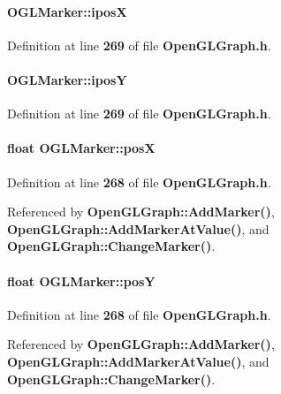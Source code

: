\paragraph[{iposX}]{ O\+G\+L\+Marker\+::iposX}\label{structOGLMarker_a1dced33c4fd1c502b32de2a3e44dea6b}


Definition at line {\bf 269} of file {\bf Open\+G\+L\+Graph.\+h}.

\paragraph[{iposY}]{ O\+G\+L\+Marker\+::iposY}\label{structOGLMarker_abf98cad4f7bb963352de5646a562b5a8}


Definition at line {\bf 269} of file {\bf Open\+G\+L\+Graph.\+h}.

\paragraph[{posX}]{\setlength{\rightskip}{0pt plus 5cm}float O\+G\+L\+Marker\+::posX}\label{structOGLMarker_a04a6f72531de5ad7d2de7ad1634b6126}


Definition at line {\bf 268} of file {\bf Open\+G\+L\+Graph.\+h}.



Referenced by {\bf Open\+G\+L\+Graph\+::\+Add\+Marker()}, {\bf Open\+G\+L\+Graph\+::\+Add\+Marker\+At\+Value()}, and {\bf Open\+G\+L\+Graph\+::\+Change\+Marker()}.

\paragraph[{posY}]{\setlength{\rightskip}{0pt plus 5cm}float O\+G\+L\+Marker\+::posY}\label{structOGLMarker_af76f9d68749df1f38a03b14686a45a12}


Definition at line {\bf 268} of file {\bf Open\+G\+L\+Graph.\+h}.



Referenced by {\bf Open\+G\+L\+Graph\+::\+Add\+Marker()}, {\bf Open\+G\+L\+Graph\+::\+Add\+Marker\+At\+Value()}, and {\bf Open\+G\+L\+Graph\+::\+Change\+Marker()}.

